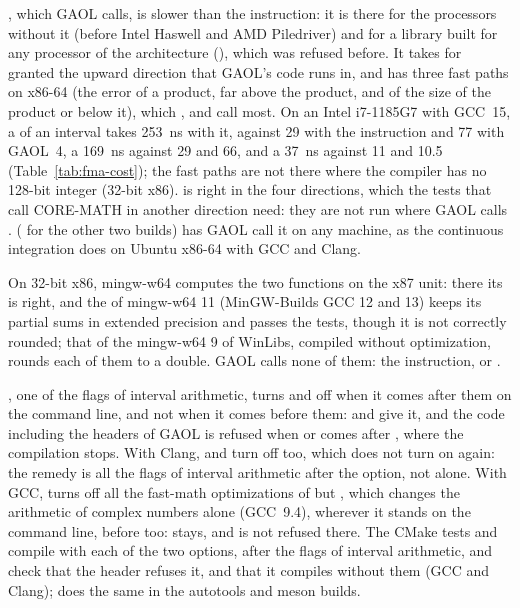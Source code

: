 \begin{Rem}
, which GAOL calls, is slower than the instruction:
it is there for the processors without it (before Intel Haswell and AMD
Piledriver) and for a library built for any processor of the architecture
(), which was refused before. It takes for granted the
upward direction that GAOL's code runs in, and has three fast paths on x86-64
(the error of a product,  far above the product, and  of the
size of the product or below it), which ,  and
 call most. On an Intel i7-1185G7 with GCC~15, a  of
an interval takes 253~ns with it, against 29 with the instruction and 77 with
GAOL~4, a  169~ns against 29 and 66, and a  37~ns
against 11 and 10.5 (Table~\ref{tab:fma-cost}); the fast paths are not
there where the compiler has no 128-bit integer (32-bit x86).
 is right in the four directions, which the tests that call
CORE-MATH in another direction need: they are not run where GAOL calls
.
 ( for the
other two builds) has GAOL call it on any machine, as the continuous
integration does on Ubuntu x86-64 with GCC and Clang.

On 32-bit x86, mingw-w64 computes the two functions on the x87 unit: there its
 is right, and the  of mingw-w64 11 (MinGW-Builds
GCC 12 and 13) keeps its partial sums in extended precision and passes the
tests, though it is not correctly rounded; that of the mingw-w64 9 of WinLibs,
compiled without optimization, rounds each of them to a double. GAOL calls
none of them: the instruction, or .
\end{Rem}

\medskip
{}, one of the flags of interval arithmetic, turns
 and  off when it comes after
them on the command line, and not when it comes before them: 
and  give it, and the code including the headers of GAOL is
refused when  or  comes after
, where the compilation stops. With Clang,
 and  turn  off
too, which  does not turn on again: the remedy is all
the flags of interval arithmetic after the option, not 
alone. With GCC,  turns off all the fast-math
optimizations of  but , which
changes the arithmetic of complex numbers alone (GCC~9.4), wherever it stands
on the command line, before  too: 
stays, and  is not refused there. The CMake tests
 and  compile
 with each of the two options, after the
flags of interval arithmetic, and check that the header refuses it, and
 that it compiles without them (GCC and Clang);
 does the same in the autotools and meson
builds.

